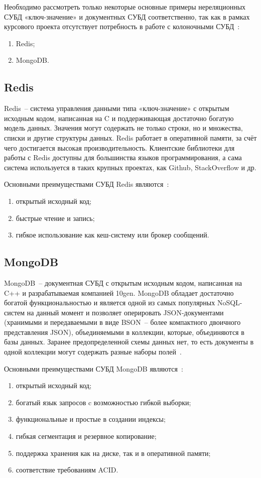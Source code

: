 Необходимо рассмотреть только некоторые основные примеры нереляционных СУБД «ключ-значение» и документных СУБД соответственно, так как в рамках курсового проекта отсутствует потребность в работе с колоночными СУБД~\cite{popularDB}:
\begin{enumerate}
	\item Redis;
	\item MongoDB.
\end{enumerate}

\subsection{Redis}

Redis~-- система управления данными типа «ключ-значение» с открытым исходным кодом, написанная на C и поддерживающая достаточно богатую модель данных.
Значения могут содержать не только строки, но и множества, списки и другие структуры данных.
Redis работает в оперативной памяти, за счёт чего достигается высокая производительность. 
Клиентские библиотеки для работы с Redis доступны для большинства языков программирования, а сама система используется в таких крупных проектах, как Github, StackOverflow и др.

Основными преимуществами СУБД Redis являются~\cite{cmpNosql1}:
\begin{enumerate}
	\item открытый исходный код;
	\item быстрые чтение и запись;
	\item гибкое использование как кеш-систему или брокер сообщений.
\end{enumerate}

\subsection{MongoDB}

MongoDB~-- документная СУБД с открытым исходным кодом, написанная на C++ и разрабатываемая компанией 10gen.
MongoDB обладает достаточно богатой функциональностью и является одной из самых популярных NoSQL-систем на данный момент и позволяет оперировать JSON-документами (хранимыми и передаваемыми в виде BSON~-- более компактного двоичного представления JSON), объединяемыми в коллекции, которые, объединяются в базы данных.
Заранее предопределенной схемы данных нет, то есть документы в одной коллекции могут содержать разные наборы полей~\cite{nosql}.

Основными преимуществами СУБД MongoDB являются~\cite{cmpNosql1}:
\begin{enumerate}
	\item открытый исходный код;
	\item богатый язык запросов c возможностью гибкой выборки;
	\item функциональные и простые в создании индексы;
	\item гибкая сегментация и резервное копирование;
	\item поддержка хранения как на диске, так и в оперативной памяти;
	\item соответствие требованиям ACID.
\end{enumerate}

